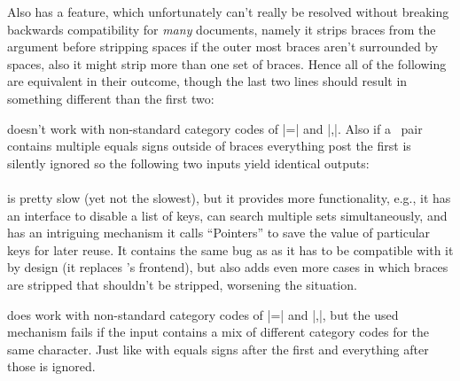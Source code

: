 Also  has a feature, which unfortunately can't really be
resolved without breaking backwards compatibility for \emph{many} documents,
namely it strips braces from the argument before stripping spaces if the
outer most braces aren't surrounded by spaces, also it might strip more than one
set of braces. Hence all of the following are equivalent in their outcome,
though the last two lines should result in something different than the first
two:
\begin{enverb}[no-tcb]
\end{enverb}

 doesn't work with non-standard category codes of |=| and |,|. Also
if a \kv\ pair contains multiple equals signs outside of braces everything post
the first is silently ignored so the following two inputs yield identical
outputs:
\begin{enverb}[no-tcb,lst=belowskip=0pt]
\end{enverb}

\paragraph{} is pretty slow (yet not the slowest), but it provides
more functionality, e.g., it has an interface to disable a list of keys, can
search multiple sets simultaneously, and has an intriguing mechanism it calls
\enquote{Pointers} to save the value of particular keys for later reuse. It
contains the same bug as  as it has to be compatible with it by
design (it replaces 's frontend), but also adds even more cases in
which braces are stripped that shouldn't be stripped, worsening the situation.

 does work with non-standard category codes of |=| and |,|, but the
used mechanism fails if the input contains a mix of different category codes for
the same character. Just like with  equals signs after the first and
everything after those is ignored.

